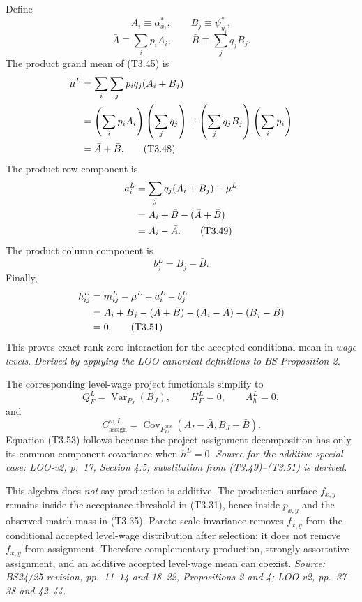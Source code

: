 \documentclass[11pt]{article}
\begin{document}
Define
\[
A_i\equiv\alpha^*_{x_i},
\qquad
B_j\equiv\psi^*_{y_j},
\tag{T3.46}
\]
\[
\bar A\equiv\sum_ip_iA_i,
\qquad
\bar B\equiv\sum_jq_jB_j.
\tag{T3.47}
\]
The product grand mean of (T3.45) is
\begin{align}
\mu^L
&=
\sum_i\sum_jp_iq_j(A_i+B_j) \notag\\
&=
\left(\sum_ip_iA_i\right)\left(\sum_jq_j\right)
+\left(\sum_jq_jB_j\right)\left(\sum_ip_i\right) \notag\\
&=
\bar A+\bar B.
\tag{T3.48}
\end{align}
The product row component is
\begin{align}
a_i^L
&=
\sum_jq_j(A_i+B_j)-\mu^L \notag\\
&=
A_i+\bar B-(\bar A+\bar B) \notag\\
&=
A_i-\bar A.
\tag{T3.49}
\end{align}
The product column component is
\[
b_j^L=B_j-\bar B.
\tag{T3.50}
\]
Finally,
\begin{align}
h_{ij}^L
&=
m_{ij}^L-\mu^L-a_i^L-b_j^L \notag\\
&=
A_i+B_j-(\bar A+\bar B)
-(A_i-\bar A)-(B_j-\bar B) \notag\\
&=0.
\tag{T3.51}
\end{align}
This proves exact rank-zero interaction for the accepted conditional mean in
\emph{wage levels}.
\textit{Derived by applying the LOO canonical definitions to BS Proposition
2.}

The corresponding level-wage project functionals simplify to
\[
Q_F^L=\operatorname{Var}_{P_J}(B_J),
\qquad
H_F^L=0,
\qquad
A_h^L=0,
\tag{T3.52}
\]
and
\[
C_{\mathrm{assign}}^{w,L}
=
\operatorname{Cov}_{P^{\mathrm{obs}}_{IJ}}
(A_I-\bar A,B_J-\bar B).
\tag{T3.53}
\]
Equation (T3.53) follows because the project assignment decomposition has
only its common-component covariance when \(h^L=0\).
\textit{Source for the additive special case: LOO-v2, p.\ 17,
Section 4.5; substitution from (T3.49)--(T3.51) is derived.}

This algebra does \emph{not} say production is additive.  The production
surface \(f_{x,y}\) remains inside the acceptance threshold in (T3.31), hence
inside \(p_{x,y}\) and the observed match mass in (T3.35).  Pareto
scale-invariance removes \(f_{x,y}\) from the conditional accepted level-wage
distribution after selection; it does not remove \(f_{x,y}\) from assignment.
Therefore complementary production, strongly assortative assignment, and an
additive accepted level-wage mean can coexist.
\textit{Source: BS24/25 revision, pp.\ 11--14 and 18--22, Propositions 2 and
4; LOO-v2, pp.\ 37--38 and 42--44.}
\end{document}
